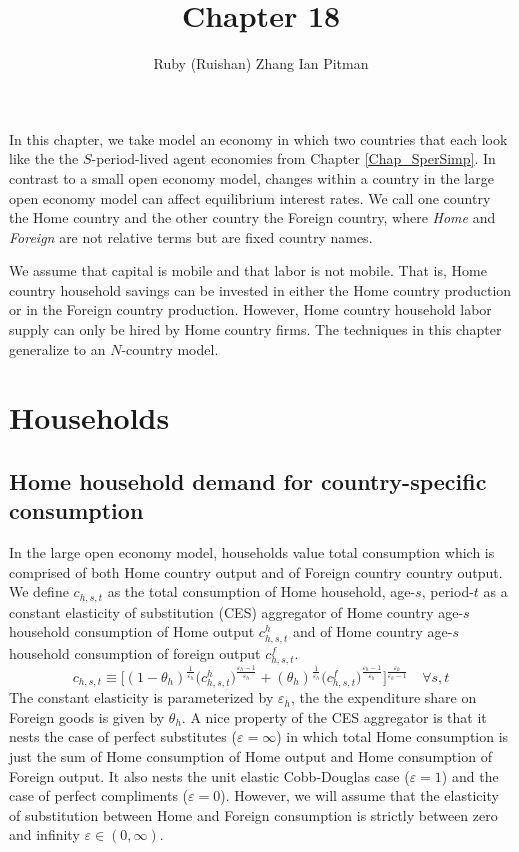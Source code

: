 \documentclass[letterpaper,12pt]{article}
\theoremstyle{definition}
\newcommand\ve{\varepsilon}
\begin{document}
\title{Chapter 18}
\author{Ruby (Ruishan) Zhang Ian Pitman}
\maketitle

In this chapter, we take model an economy in which two countries that each look like the the $S$-period-lived agent economies from Chapter \ref{Chap_SperSimp}. In contrast to a small open economy model, changes within a country in the large open economy model can affect equilibrium interest rates. We call one country the Home country and the other country the Foreign country, where \textit{Home} and \textit{Foreign} are not relative terms but are fixed country names.

We assume that capital is mobile and that labor is not mobile. That is, Home country household savings can be invested in either the Home country production or in the Foreign country production. However, Home country household labor supply can only be hired by Home country firms. The techniques in this chapter generalize to an $N$-country model.


\section{Households}\label{SecLgOpenHH}


  \subsection{Home household demand for country-specific consumption}\label{SecLgOpenHHhomeSpec}

    In the large open economy model, households value total consumption which is comprised of both Home country output and of Foreign country country output. We define $c_{h,s,t}$ as the total consumption of Home household, age-$s$, period-$t$ as a constant elasticity of substitution (CES) aggregator of Home country age-$s$ household consumption of Home output $c^h_{h,s,t}$ and of Home country age-$s$ household consumption of foreign output $c^f_{h,s,t}$.
    \begin{equation}\label{EqLgOpenHHchCES}
      c_{h,s,t}\equiv \biggl[(1 - \theta_h)^\frac{1}{\ve_h}\bigl(c^h_{h,s,t}\bigr)^\frac{\ve_h-1}{\ve_h} + (\theta_h)^\frac{1}{\ve_h}\bigl(c^f_{h,s,t}\bigr)^\frac{\ve_h-1}{\ve_h}\biggr]^\frac{\ve_h}{\ve_h-1} \quad\forall s,t
    \end{equation}
    The constant elasticity is parameterized by $\ve_h$, the the expenditure share on Foreign goods is given by $\theta_h$. A nice property of the CES aggregator is that it nests the case of perfect substitutes ($\ve=\infty$) in which total Home consumption is just the sum of Home consumption of Home output and Home consumption of Foreign output. It also nests the unit elastic Cobb-Douglas case ($\ve=1$) and the case of perfect compliments ($\ve=0$). However, we will assume that the elasticity of substitution between Home and Foreign consumption is strictly between zero and infinity $\ve\in(0,\infty)$.
\end{document}
